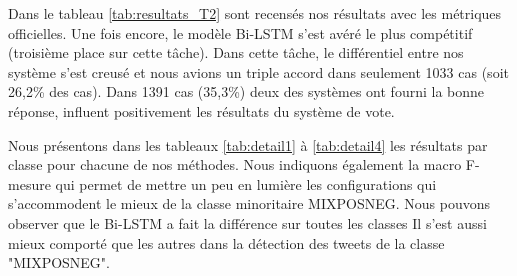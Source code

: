  Dans le tableau \ref{tab:resultats_T2} sont recensés nos résultats avec les métriques officielles.
 Une fois encore, le modèle Bi-LSTM s'est avéré le plus compétitif (troisième place sur cette tâche).
Dans cette tâche, le différentiel entre nos système s'est creusé et nous avions un triple accord dans seulement 1033 cas (soit 26,2\% des cas). Dans 1391 cas (35,3\%) deux des systèmes ont fourni la bonne réponse, influent positivement les résultats du système de vote.

 



Nous présentons dans les tableaux \ref{tab:detail1} à \ref{tab:detail4} les résultats par classe pour chacune de nos méthodes.
 Nous indiquons également la macro F-mesure qui permet de mettre un peu en lumière les configurations qui s'accommodent le mieux de la classe minoritaire MIXPOSNEG.
 Nous pouvons observer que le Bi-LSTM a fait la différence sur toutes les classes
 Il s'est aussi mieux comporté que les autres dans la détection des tweets de la classe "MIXPOSNEG".
